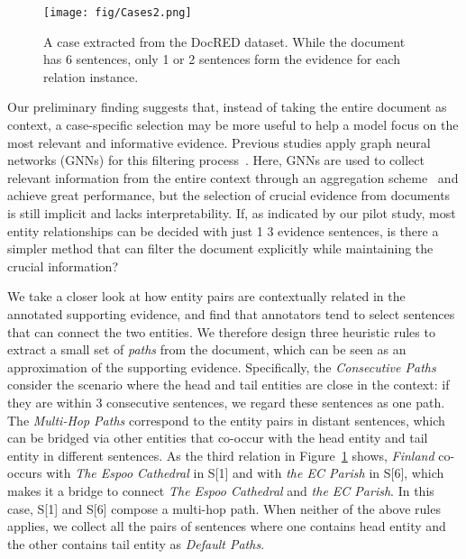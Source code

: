 \documentclass[11pt,a4paper]{article}
\begin{document}
\begin{figure}
    \centering
    \texttt{[image: fig/Cases2.png]}
    \caption{A case extracted from the DocRED dataset. While the document has 6 sentences, only 1 or 2 sentences form the evidence for each relation instance.}
    \label{fig:intro_case}
    \vspace{-0.4cm}
\end{figure}


Our preliminary finding suggests that, instead of taking the entire document as context, a case-specific selection may be more useful to help a model  focus on the most relevant and informative evidence. Previous studies apply graph neural networks (GNNs) for this filtering process~\cite{christopoulou2019connecting,zeng2020double}. Here, GNNs are used to collect relevant information from the entire context through an aggregation scheme~\cite{nan-etal-2020-reasoning} and achieve great performance, but the selection of crucial evidence from documents is still implicit and lacks interpretability. If, as indicated by our pilot study, most entity relationships can be decided with just 1  3 evidence sentences, is there a simpler method that can filter the document explicitly while maintaining the crucial information?


We take a closer look at how entity pairs are contextually related in the annotated supporting evidence, and find that annotators tend to select sentences that can connect the two entities.
We therefore design three heuristic rules to extract a small set of \textit{paths} from the document, which can be seen as an approximation of the supporting evidence. Specifically, the \textit{Consecutive Paths} consider the scenario where the head and tail entities are close in the context: if they are within 3 consecutive sentences, we regard these sentences as one path. The \textit{Multi-Hop Paths} correspond to the entity pairs in distant sentences, which can be bridged via other entities that co-occur with the head entity and tail entity in different sentences. 
As the third relation in Figure~\ref{fig:intro_case} shows, \textit{Finland} co-occurs with \textit{The Espoo Cathedral} in S[1] and with \textit{the EC Parish} in S[6], which makes it a bridge to connect \textit{The Espoo Cathedral} and \textit{the EC Parish}. In this case, S[1] and S[6] compose a multi-hop path. When neither of the above rules applies, we collect all the pairs of sentences where one contains head entity and the other contains tail entity as \textit{Default Paths}.
\end{document}
